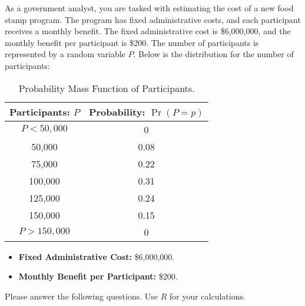 \documentclass[11pt]{article}
\begin{document}
As a government analyst, you are tasked with estimating the cost of a new food stamp program. The program has fixed administrative costs, and each participant receives a monthly benefit. The fixed administrative cost is \$6,000,000, and the monthly benefit per participant is \$200. The number of participants is represented by a random variable $P$. Below is the distribution for the number of participants:

\begin{table}[h!] 
\centering 
\begin{tabular}{c|c} 
\hline 
Participants: $P$ & Probability: $\Pr(P = p)$ \\
\hline 
$P < 50,000$ & 0 \\ 50,000 & 0.08 \\ 75,000 & 0.22 \\ 100,000 & 0.31 \\ 125,000 & 0.24 \\ 150,000 & 0.15 \\ $P > 150,000$ & 0 \\ 
\hline 
\end{tabular} 
\caption{Probability Mass Function of Participants.} 
\end{table} 

\begin{itemize} 
\item \textbf{Fixed Administrative Cost:} \$6,000,000. 
\item \textbf{Monthly Benefit per Participant:} \$200. 
\end{itemize}

\noindent Please answer the following questions. Use $R$ for your calculations. 
\end{document}
